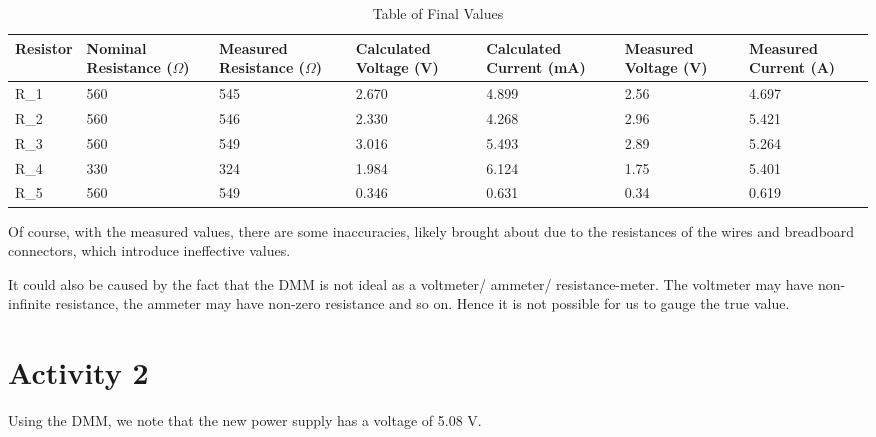 \documentclass{article}
\begin{document}
\begin{table}[!h]
    \centering
    \begin{tabular}{|P{15mm}|P{15mm}|P{15mm}|P{15mm}|P{15mm}|P{15mm}|P{15mm}|}
        \hline Resistor & Nominal \newline Resistance ($\Omega$) & Measured \newline Resistance ($\Omega$) & Calculated Voltage (V) & Calculated \newline Current (mA) & Measured \newline Voltage (V) & Measured \newline Current (A) \\
        \hline R_1 & 560 & 545 & 2.670 & 4.899 & 2.56 & 4.697  \\
        \hline R_2 & 560 & 546 & 2.330 & 4.268 & 2.96 & 5.421 \\
        \hline R_3 & 560 & 549 & 3.016 & 5.493 & 2.89 & 5.264 \\
        \hline R_4 & 330 & 324 & 1.984 & 6.124 & 1.75 & 5.401 \\
        \hline R_5 & 560 & 549 & 0.346 & 0.631 & 0.34 & 0.619 \\
        \hline
    \end{tabular}
    \caption{Table of Final Values}
    \label{tab:final}
\end{table}

Of course, with the measured values, there are some inaccuracies, likely brought about due to the resistances of the wires and breadboard connectors, which introduce ineffective values.

It could also be caused by the fact that the DMM is not ideal as a voltmeter/ ammeter/ resistance-meter. The voltmeter may have non-infinite resistance, the ammeter may have non-zero resistance and so on. Hence it is not possible for us to gauge the true value.

\newpage
\section{Activity 2}

Using the DMM, we note that the new power supply has a voltage of 5.08 V.
\end{document}
